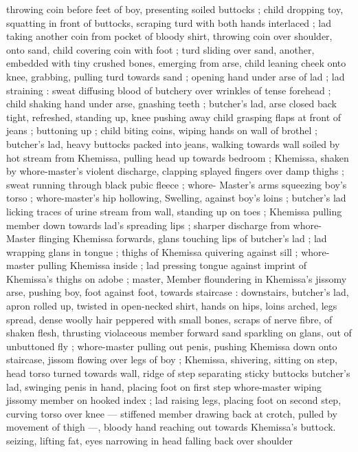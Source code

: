 throwing coin before feet of boy, presenting soiled buttocks ; child 
dropping toy, squatting in front of buttocks, scraping turd with both 
hands interlaced ; lad taking another coin from pocket of bloody 
shirt, throwing coin over shoulder, onto sand, child covering coin with 
foot ; turd sliding over sand, another, embedded with tiny crushed 
bones, emerging from arse, child leaning cheek onto knee, grabbing, 
pulling turd towards sand ; opening hand under arse of lad ; lad 
straining : sweat diffusing blood of butchery over wrinkles of tense 
forehead ; child shaking hand under arse, gnashing teeth ; butcher's 
lad, arse closed back tight, refreshed, standing up, knee pushing 
away child grasping flaps at front of jeans ; buttoning up ; child 
biting coins, wiping hands on wall of brothel ; butcher's lad, heavy 
buttocks packed into jeans, walking towards wall soiled by hot stream 
from Khemissa, pulling head up towards bedroom ; Khemissa, shaken 
by whore-master's violent discharge, clapping splayed fingers over 
damp thighs ; sweat running through black pubic fleece ; whore- 
Master's arms squeezing boy's torso ; whore-master's hip hollowing, 
Swelling, against boy's loins ; butcher's lad licking traces of urine 
stream from wall, standing up on toes ; Khemissa pulling member 
down towards lad's spreading lips ; sharper discharge from whore- 
Master flinging Khemissa forwards, glans touching lips of butcher's 
lad ; lad wrapping glans in tongue ; thighs of Khemissa quivering 
against sill ; whore-master pulling Khemissa inside ; lad pressing 
tongue against imprint of Khemissa's thighs on adobe ; master, 
Member floundering in Khemissa's jissomy arse, pushing boy, foot 
against foot, towards staircase : downstairs, butcher's lad, apron 
rolled up, twisted in open-necked shirt, hands on hips, loins arched, 
legs spread, dense woolly hair peppered with small bones, scraps of 
nerve fibre, of shaken flesh, thrusting violaceous member forward 
sand sparkling on glans, out of unbuttoned fly ; whore-master 
pulling out penis, pushing Khemissa down onto staircase, jissom 
flowing over legs of boy ; Khemissa, shivering, sitting on step, head 
torso turned towards wall, ridge of step separating sticky buttocks 
butcher's lad, swinging penis in hand, placing foot on first step 
whore-master wiping jissomy member on hooked index ; lad raising 
legs, placing foot on second step, curving torso over knee --- 
stiffened member drawing back at crotch, pulled by movement of 
thigh ---, bloody hand reaching out towards Khemissa's buttock. 
seizing, lifting fat, eyes narrowing in head falling back over shoulder 
